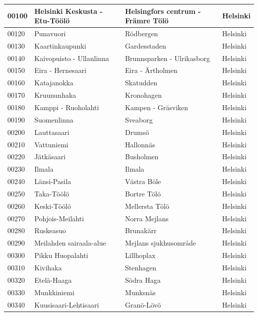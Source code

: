 \begin{longtable}{llll}
    00100 & Helsinki Keskusta - Etu-Töölö & Helsingfors centrum - Främre Tölö & Helsinki \\ [0.5 ex] \hline
    00120 & Punavuori & Rödbergen & Helsinki \\ [0.25ex] \hline
    00130 & Kaartinkaupunki & Gardesstaden & Helsinki \\ [0.25ex] \hline
    00140 & Kaivopuisto - Ullanlinna & Brunnsparken - Ulrikasborg & Helsinki \\ [0.25ex] \hline
    00150 & Eira - Hernesaari & Eira - Ärtholmen & Helsinki \\ [0.25ex] \hline
    00160 & Katajanokka & Skatudden & Helsinki \\ [0.25ex] \hline
    00170 & Kruununhaka & Kronohagen & Helsinki \\ [0.25ex] \hline
    00180 & Kamppi - Ruoholahti & Kampen - Gräsviken & Helsinki  \\ [0.25ex] \hline
    00190 & Suomenlinna & Sveaborg & Helsinki \\ [0.25ex] \hline
    00200 & Lauttasaari & Drumsö & Helsinki \\ [0.25ex] \hline
    00210 & Vattuniemi & Hallonnäs & Helsinki \\ [0.25ex] \hline
    00220 & Jätkäsaari & Busholmen & Helsinki \\ [0.25ex] \hline
    00230 & Ilmala & Ilmala & Helsinki \\ [0.25ex] \hline
    00240 & Länsi-Pasila & Västra Böle & Helsinki \\ [0.25ex] \hline
    00250 & Taka-Töölö & Bortre Tölö & Helsinki \\ [0.25ex] \hline
    00260 & Keski-Töölö & Mellersta Tölö & Helsinki \\ [0.25ex] \hline
    00270 & Pohjois-Meilahti & Norra Mejlans & Helsinki \\ [0.25ex] \hline
    00280 & Ruskeasuo & Brunakärr & Helsinki \\ [0.25ex] \hline
    00290 & Meilahden sairaala-alue & Mejlans sjukhusområde & Helsinki \\ [0.25ex] \hline
    00300 & Pikku Huopalahti & Lillhoplax & Helsinki \\ [0.25ex] \hline
    00310 & Kivihaka & Stenhagen & Helsinki \\ [0.25ex] \hline
    00320 & Etelä-Haaga & Södra Haga & Helsinki \\ [0.25ex] \hline
    00330 & Munkkiniemi & Munksnäs & Helsinki \\ [0.25ex] \hline
    00340 & Kuusisaari-Lehtisaari & Granö-Lövö & Helsinki \\ [0.25ex] \hline

\end{longtable}
